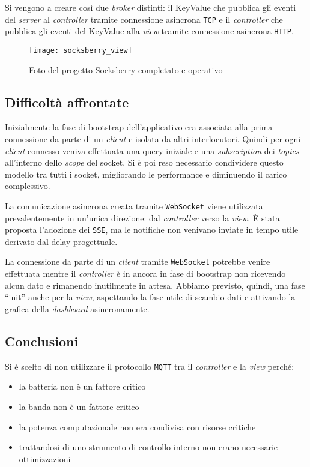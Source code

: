 Si vengono a creare così due \textit{broker} distinti: il KeyValue che pubblica gli eventi del \textit{server} al \textit{controller} tramite connessione asincrona \verb+TCP+ e il \textit{controller} che pubblica gli eventi del KeyValue alla \textit{view} tramite connessione asincrona \verb+HTTP+.

\begin{figure}[H]
  \centering
  \texttt{[image: socksberry\_view]}
  \caption{Foto del progetto Socksberry completato e operativo}
  \label{fig:socksberryView}
\end{figure}

\subsection{Difficoltà affrontate}
\label{subsec:socksberryDifficolta}

Inizialmente la fase di bootstrap dell'applicativo era associata alla prima connessione da parte di un \textit{client} e isolata da altri interlocutori.
Quindi per ogni \textit{client} connesso veniva effettuata una query iniziale e una \textit{subscription} dei \textit{topics} all'interno dello \textit{scope} del socket.
Si è poi reso necessario condividere questo modello tra tutti i socket, migliorando le performance e diminuendo il carico complessivo.

La comunicazione asincrona creata tramite \verb+WebSocket+ viene utilizzata prevalentemente in un'unica direzione: dal \textit{controller} verso la \textit{view}.
È stata proposta l'adozione dei \verb+SSE+, ma le notifiche non venivano inviate in tempo utile derivato dal delay progettuale.

La connessione da parte di un \textit{client} tramite \verb+WebSocket+ potrebbe venire effettuata mentre il \textit{controller} è in ancora in fase di bootstrap non ricevendo alcun dato e rimanendo inutilmente in attesa.
Abbiamo previsto, quindi, una fase ``init'' anche per la \textit{view}, aspettando la fase utile di scambio dati e attivando la grafica della \textit{dashboard} asincronamente.

\subsection{Conclusioni}
\label{subsec:socksberryConclusioni}

Si è scelto di non utilizzare il protocollo \verb+MQTT+ tra il \textit{controller} e la \textit{view} perché:
\begin{itemize}
  \item la batteria non è un fattore critico
  \item la banda non è un fattore critico
  \item la potenza computazionale non era condivisa con risorse critiche
  \item trattandosi di uno strumento di controllo interno non erano necessarie ottimizzazioni
\end{itemize}
